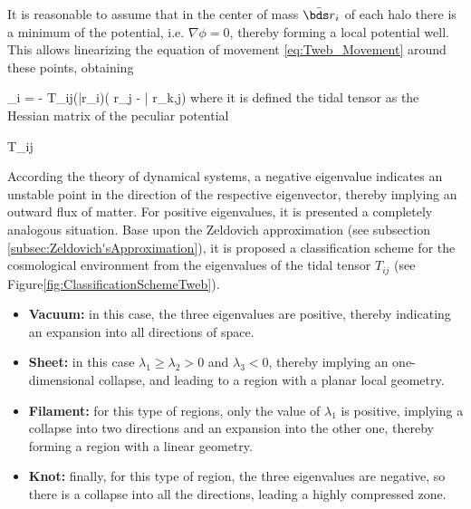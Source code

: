 It is reasonable to assume that in the center of mass $\bar{\bds r}_i$ of 
each halo there is a minimum of the potential, i.e. $\nabla \phi = 0$, 
thereby forming a local potential well. This allows linearizing the 
equation of movement \ref{eq:Tweb_Movement} around these points, obtaining


{ _i = - T_{ij}(\bar{\bds r}_i)( r_j - \bar{ r}_{k,j})}
where it is defined the tidal tensor as the Hessian matrix of the peculiar
potential



{ T_{ij} \equiv {}}


According the theory of dynamical systems, a negative eigenvalue 
indicates an unstable point in the direction of the respective eigenvector, 
thereby implying an outward flux of matter. For positive eigenvalues, it is
presented a completely analogous situation. Base upon the Zeldovich 
approximation (see subsection \ref{subsec:Zeldovich'sApproximation}), it is
proposed a classification scheme for the cosmological environment from the
eigenvalues of the tidal tensor $T_{ij}$ 
(see Figure\ref{fig:ClassificationSchemeTweb}). 


\begin{itemize}
\item \textbf{Vacuum:} in this case, the three eigenvalues are positive,
thereby indicating an expansion into all directions of space.
\item \textbf{Sheet:} in this case $\lambda_1\geq\lambda_2>0$ and 
$\lambda_3<0$, thereby implying an one-dimensional collapse, and leading 
to a region with a planar local geometry.
\item \textbf{Filament:} for this type of regions, only the value of 
$\lambda_1$ is positive, implying a collapse into two directions and an 
expansion into the other one, thereby forming a region with a linear 
geometry.
\item \textbf{Knot:} finally, for this type of region, the three 
eigenvalues are negative, so there is a collapse into all the directions,
leading a highly compressed zone.
\end{itemize}


